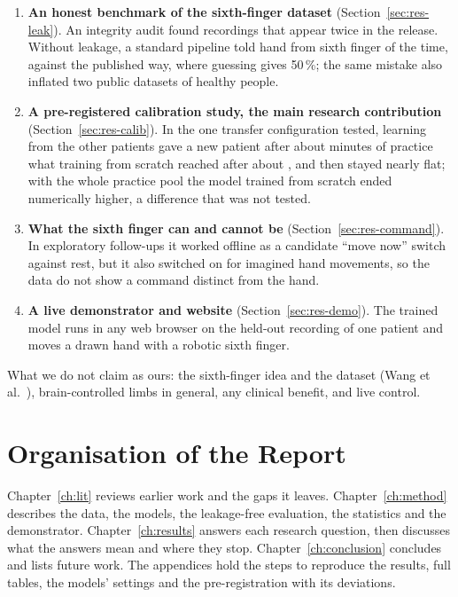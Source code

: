 \begin{enumerate}
  \item \textbf{An honest benchmark of the sixth-finger dataset} (Section~\ref{sec:res-leak}). An
  integrity audit found recordings that appear twice in the release. Without leakage, a
  standard pipeline told hand from sixth finger \pct{\rqOneCspLdaCvLeakfreeMean} of the time,
  against \pct{\rqOneCspLdaPaperReplicaMean} the published way, where guessing gives 50\,\%;
  the same mistake also inflated two public datasets of healthy people.
  \item \textbf{A pre-registered calibration study, the main research contribution}
  (Section~\ref{sec:res-calib}). In the one transfer configuration tested, learning from the
  other patients gave a new patient after about \rqTwoMinutesKOne{} minutes of practice what
  training from scratch reached after about \rqTwoMinutesKTen{}, and then stayed nearly flat;
  with the whole practice pool the model trained from scratch ended numerically higher, a
  difference that was not tested.
  \item \textbf{What the sixth finger can and cannot be} (Section~\ref{sec:res-command}). In
  exploratory follow-ups it worked offline as a candidate ``move now'' switch against rest,
  but it also switched on for imagined hand movements, so the data do not show a command
  distinct from the hand.
  \item \textbf{A live demonstrator and website} (Section~\ref{sec:res-demo}). The trained
  model runs in any web browser on the held-out recording of one patient and moves a drawn
  hand with a robotic sixth finger.
\end{enumerate}

What we do not claim as ours: the sixth-finger idea and the dataset (Wang et
al.~\cite{wang2024jbhi,wang2026dataset}), brain-controlled limbs in general, any
clinical benefit, and live control.

\section{Organisation of the Report}\label{sec:intro-org}

Chapter~\ref{ch:lit} reviews earlier work and the gaps it leaves. Chapter~\ref{ch:method}
describes the data, the models, the leakage-free evaluation, the statistics and the
demonstrator. Chapter~\ref{ch:results} answers each research question, then discusses what the
answers mean and where they stop. Chapter~\ref{ch:conclusion} concludes and lists future
work. The appendices hold the steps to reproduce the results, full tables, the models'
settings and the pre-registration with its deviations.
